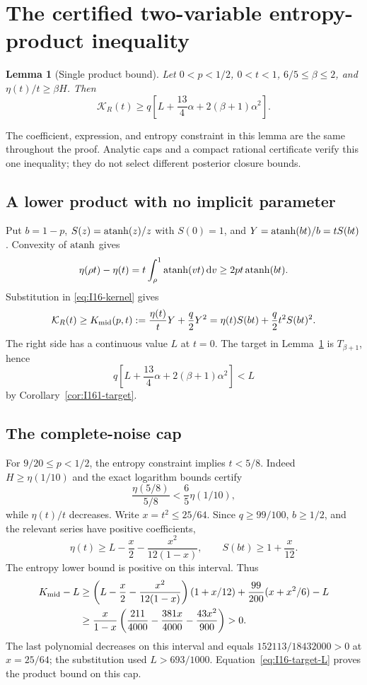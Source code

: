 \documentclass[11pt]{article}
\newtheorem{lemma}[theorem]{Lemma}
\theoremstyle{remark}\newtheorem{remark}[theorem]{Remark}
\numberwithin{equation}{section}
\begin{document}
\section{The certified two-variable entropy-product inequality}\label{sec:product}
\begin{lemma}[Single product bound]\label{lem:I16-product}
Let $0<p<1/2$, $0<t<1$, $6/5\le\beta\le2$, and
$\eta(t)/t\ge\beta H$. Then
\begin{equation}\label{eq:I16-product}
 \boxed{\mathcal K_R(t)\ge
 q\left[L+\frac{13}{4}\alpha+2(\beta+1)\alpha^2\right].}
\end{equation}
\end{lemma}
The coefficient, expression, and entropy constraint in this lemma are the
same throughout the proof. Analytic caps and a compact rational certificate
verify this one inequality; they do not select different posterior closure
bounds.

\subsection{A lower product with no implicit parameter}
Put $b=1-p$, $S(z)=\operatorname{atanh}(z)/z$ with $S(0)=1$, and
$Y=\operatorname{atanh}(bt)/b=tS(bt)$. Convexity of $\operatorname{atanh}$ gives
\[
 \eta(\rho t)-\eta(t)
 =t\int_\rho^1\operatorname{atanh}(vt)\,\mathrm dv
 \ge2pt\operatorname{atanh}(bt).
\]
Substitution in \eqref{eq:I16-kernel} gives
\begin{equation}\label{eq:I16-midpoint}
 \mathcal K_R(t)\ge K_{\rm mid}(p,t)
 :=\frac{\eta(t)}tY+\frac q2Y^2
 =\eta(t)S(bt)+\frac q2t^2S(bt)^2.
\end{equation}
The right side has a continuous value $L$ at $t=0$.
The target in Lemma~\ref{lem:I16-product} is $T_{\beta+1}$, hence
\begin{equation}\label{eq:I16-target-L}
 q\left[L+\frac{13}{4}\alpha+2(\beta+1)\alpha^2\right]<L
\end{equation}
by Corollary~\ref{cor:I161-target}.

\subsection{The complete-noise cap}
For $9/20\le p<1/2$, the entropy constraint implies $t<5/8$.
Indeed $H\ge\eta(1/10)$ and the exact logarithm bounds certify
\[
 \frac{\eta(5/8)}{5/8}<\frac65\eta(1/10),
\]
while $\eta(t)/t$ decreases. Write $x=t^2\le25/64$.
Since $q\ge99/100$, $b\ge1/2$, and the relevant series have positive
coefficients,
\[
 \eta(t)\ge L-\frac x2-\frac{x^2}{12(1-x)},\qquad
 S(bt)\ge1+\frac{x}{12}.
\]
The entropy lower bound is positive on this interval. Thus
\begin{align*}
 K_{\rm mid}-L
 &\ge\left(L-\frac x2-\frac{x^2}{12(1-x)}\right)(1+x/12)
       +\frac{99}{200}(x+x^2/6)-L\\
 &\ge\frac{x}{1-x}
 \left(\frac{211}{4000}-\frac{381x}{4000}-\frac{43x^2}{900}\right)>0.
\end{align*}
The last polynomial decreases on this interval and equals
$152113/18432000>0$ at $x=25/64$; the substitution used $L>693/1000$.
Equation~\eqref{eq:I16-target-L} proves the product bound on this cap.
\end{document}
